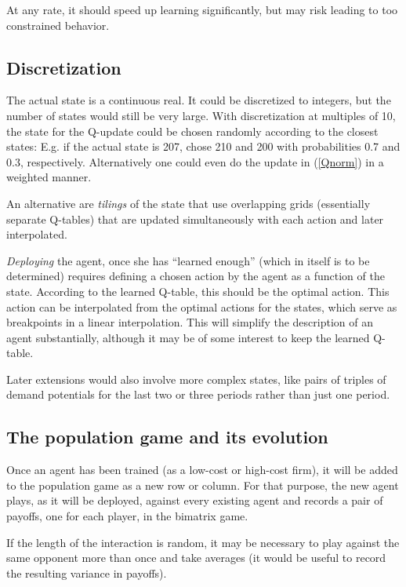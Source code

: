 \documentclass[a4paper,12pt]{article}  %
\theoremstyle{definition}
\begin{document}
At any rate, it should speed up learning significantly, but
may risk leading to too constrained behavior.

\subsection{Discretization}

The actual state is a continuous real.
It could be discretized to integers, but the number of
states would still be very large.
With discretization at multiples of 10, the state for the
Q-update could be chosen randomly according to the closest
states: E.g. if the actual state is 207, chose 210 and 200
with probabilities 0.7 and 0.3, respectively.
Alternatively one could even do the update in (\ref{Qnorm}) 
in a weighted manner.

An alternative are \textit{tilings} of the state that use
overlapping grids (essentially separate Q-tables) that are
updated simultaneously with each action and later
interpolated.

\textit{Deploying} the agent, once she has ``learned
enough'' (which in itself is to be determined)
requires defining a chosen action by the agent as a function
of the state.
According to the learned Q-table, this should be the optimal
action.
This action can be interpolated from the optimal actions for
the states, which serve as breakpoints in a linear
interpolation. 
This will simplify the description of an agent
substantially, although it may be of some interest to keep
the learned Q-table.

Later extensions would also involve more complex states, like
pairs of triples of demand potentials for the last two or
three periods rather than just one period.

\subsection{The population game and its evolution}

Once an agent has been trained (as a low-cost or high-cost
firm), it will be added to the population game as a new row
or column.
For that purpose, the new agent plays, as it will be
deployed, against every existing agent and records a pair of
payoffs, one for each player, in the bimatrix game.

If the length of the interaction is random, it may be
necessary to play against the same opponent more than once
and take averages (it would be useful to record the
resulting variance in payoffs).
\end{document}
